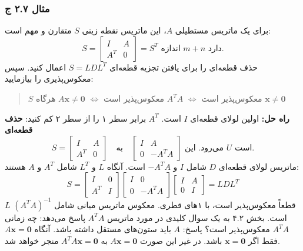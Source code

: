 \documentclass[12pt, a4paper]{book}
\begin{document}
	\subsubsection*{مثال ۲.۷ ج}
	برای یک ماتریس مستطیلی $A$، این ماتریس نقطه زینی $S$ متقارن و مهم است:
	\[ S = \begin{bmatrix} I & A \\ A^T & 0 \end{bmatrix} = S^T \text{ اندازه } m+n \text{ دارد.} \]
	حذف قطعه‌ای را برای یافتن تجزیه قطعه‌ای $S=LDL^T$ اعمال کنید. سپس معکوس‌پذیری را بیازمایید:
	\begin{quote}
		$S$ معکوس‌پذیر است $\iff$ $A^TA$ معکوس‌پذیر است $\iff$ $A\mathbf{x} \neq \mathbf{0}$ هرگاه $\mathbf{x} \neq \mathbf{0}$
	\end{quote}
	\textbf{راه حل:} اولین لولای قطعه‌ای $I$ است. $A^T$ برابر سطر ۱ را از سطر ۲ کم کنید:
	\textbf{حذف قطعه‌ای}
	\[ S = \begin{bmatrix} I & A \\ A^T & 0 \end{bmatrix} \quad \text{به} \quad \begin{bmatrix} I & A \\ 0 & -A^TA \end{bmatrix} \text{ می‌رود. این } U \text{ است.} \]
	ماتریس لولای قطعه‌ای $D$ شامل $I$ و $-A^TA$ است. آنگاه $L$ و $L^T$ شامل $A^T$ و $A$ هستند:
	\[ S = \begin{bmatrix} I & 0 \\ A^T & I \end{bmatrix} \begin{bmatrix} I & 0 \\ 0 & -A^TA \end{bmatrix} \begin{bmatrix} I & A \\ 0 & I \end{bmatrix} = LDL^T \]
	$L$ قطعاً معکوس‌پذیر است، با ۱‌های قطری. معکوس ماتریس میانی شامل $(A^TA)^{-1}$ است. بخش ۴.۲ به یک سوال کلیدی در مورد ماتریس $A^TA$ پاسخ می‌دهد:
	چه زمانی $A^TA$ معکوس‌پذیر است؟ پاسخ: $A$ باید ستون‌های مستقل داشته باشد.
	آنگاه $A\mathbf{x}=\mathbf{0}$ فقط اگر $\mathbf{x}=\mathbf{0}$ باشد. در غیر این صورت $A\mathbf{x}=\mathbf{0}$ به $A^TA\mathbf{x}=\mathbf{0}$ منجر خواهد شد.
	
	\newpage
\end{document}
